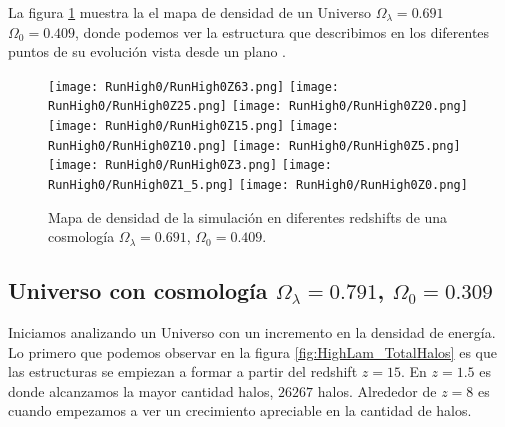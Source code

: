 La figura \ref{fig:High0-DensityMap} muestra la el mapa de densidad de un Universo $\Omega_\lambda = 0.691$ $\Omega_0 = 0.409$, donde podemos ver la estructura que describimos  en los diferentes puntos de su evolución vista desde un plano .
\begin{figure}[H]
    \centering

    \texttt{[image: RunHigh0/RunHigh0Z63.png]}   %
    \texttt{[image: RunHigh0/RunHigh0Z25.png]}   %
    \texttt{[image: RunHigh0/RunHigh0Z20.png]}   %
    \\
    \texttt{[image: RunHigh0/RunHigh0Z15.png]}   %
    \texttt{[image: RunHigh0/RunHigh0Z10.png]}   %
    \texttt{[image: RunHigh0/RunHigh0Z5.png]}    %
    \\
    \texttt{[image: RunHigh0/RunHigh0Z3.png]}    %
    \texttt{[image: RunHigh0/RunHigh0Z1\_5.png]}  %
    \texttt{[image: RunHigh0/RunHigh0Z0.png]}    %
    \caption[Mapa de densidad en en diferentes redshift]{ \footnotesize Mapa de densidad de la simulación en diferentes redshifts de una cosmología $\Omega_\lambda = 0.691$, $\Omega_0 = 0.409$. }
    \label{fig:High0-DensityMap}
\end{figure}


\subsection{Universo con cosmología \texorpdfstring{$\Omega_\lambda = 0.791$, $\Omega_0 = 0.309$ }{Omega lambda = 0.791, Omega 0 = 0.409}  }

Iniciamos analizando un Universo con un incremento en la densidad de energía. Lo primero que podemos observar en la figura \ref{fig:HighLam_TotalHalos} es que las estructuras se empiezan a formar a partir del redshift $z=15$. En $z= 1.5$ es donde alcanzamos la mayor cantidad halos, $26267$ halos. Alrededor de $z = 8$ es cuando empezamos a ver un crecimiento apreciable en la cantidad de halos.

